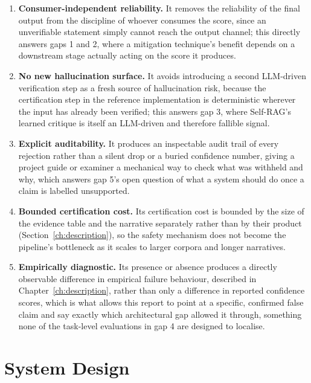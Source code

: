 \documentclass[12pt,a4paper]{report}
\begin{document}
\begin{enumerate}
  \item \textbf{Consumer-independent reliability.} It removes the reliability
        of the final output from the discipline of whoever consumes the
        score, since an unverifiable statement simply cannot reach the output
        channel; this directly answers gaps 1 and 2, where a mitigation
        technique's benefit depends on a downstream stage actually acting on
        the score it produces.
  \item \textbf{No new hallucination surface.} It avoids introducing a second
        LLM-driven verification step as a fresh source of hallucination risk,
        because the certification step in the reference implementation is
        deterministic wherever the input has already been verified; this
        answers gap 3, where Self-RAG's learned critique is itself an
        LLM-driven and therefore fallible signal.
  \item \textbf{Explicit auditability.} It produces an inspectable audit trail
        of every rejection rather than a silent drop or a buried confidence
        number, giving a project guide or examiner a mechanical way to check
        what was withheld and why, which answers gap 5's open question of what
        a system should do once a claim is labelled unsupported.
  \item \textbf{Bounded certification cost.} Its certification cost is bounded
        by the size of the evidence table and the narrative separately rather
        than by their product (Section~\ref{ch:description}), so the safety
        mechanism does not become the pipeline's bottleneck as it scales to
        larger corpora and longer narratives.
  \item \textbf{Empirically diagnostic.} Its presence or absence produces a
        directly observable difference in empirical failure behaviour,
        described in Chapter~\ref{ch:description}, rather than only a
        difference in reported confidence scores, which is what allows this
        report to point at a specific, confirmed false claim and say exactly
        which architectural gap allowed it through, something none of the
        task-level evaluations in gap 4 are designed to localise.
\end{enumerate}

\chapter{System Design}
\label{ch:design}
\end{document}
